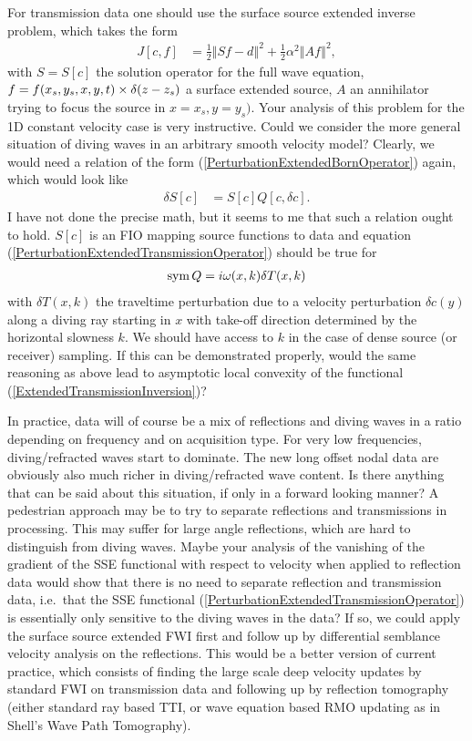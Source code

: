 \documentclass[10pt]{article}
\begin{document}
For transmission data one should use the surface source extended inverse problem, which takes the form
\begin{align}\label{ExtendedTransmissionInversion}
  J[c,f] & = \frac{1}{2}\left\Vert Sf-d \right\Vert^2 + \frac{1}{2}\alpha^2\left\Vert Af\right\Vert^2,
\end{align}
with $S=S[c]$ the solution operator for the full wave equation, $f=f(x_s,y_s,x,y,t)\break\times\delta(z-z_s)$ a surface extended source, $A$ an annihilator trying to focus the source in $x=x_s, y=y_s)$. Your analysis of this problem for the 1D constant velocity case is very instructive. Could we consider the more general situation of diving waves in an arbitrary smooth velocity model? Clearly, we would need a relation of the form (\ref{PerturbationExtendedBornOperator}) again, which would look like
\begin{align}\label{PerturbationExtendedTransmissionOperator}
  \delta S[c] & = S[c]Q[c,\delta c].
\end{align}
I have not done the precise math, but it seems to me that such a relation ought to hold. $S[c]$ is an FIO mapping source functions to data and equation (\ref{PerturbationExtendedTransmissionOperator}) should be true for
\begin{align}\label{symbolQ}
{\rm sym}\, Q=i\omega(x,k)\delta T(x,k)
\end{align} 
with $\delta T(x,k)$ the traveltime perturbation due to a velocity perturbation $\delta c(y)$ along a diving ray starting in $x$ with take-off direction determined by the horizontal slowness $k$. We should have access to $k$ in the case of dense source (or receiver) sampling. If this can be demonstrated properly, would the same reasoning as above lead to asymptotic local convexity of the functional (\ref{ExtendedTransmissionInversion})?

In practice, data will of course be a mix of reflections and diving waves in a ratio depending on frequency and on acquisition type. For very low frequencies, diving/refracted waves start to dominate. The new long offset nodal data are obviously also much richer in diving/refracted wave content. Is there anything that can be said about this situation, if only in a forward looking manner? A pedestrian approach may be to try to separate reflections and transmissions in processing. This may suffer for large angle reflections, which are hard to distinguish from diving waves. Maybe your analysis of the vanishing of the gradient of the SSE functional with respect to velocity when applied to reflection data would show that there is no need to separate reflection and transmission data, i.e.\, that the SSE functional (\ref{PerturbationExtendedTransmissionOperator}) is essentially only sensitive to the diving waves in the data? If so, we could apply the surface source extended FWI first and follow up by differential semblance velocity analysis on the reflections. This would be a better version of current practice, which consists of finding the large scale deep velocity updates by standard FWI on transmission data and following up by reflection tomography (either standard ray based TTI, or wave equation based RMO updating as in Shell's Wave Path Tomography).
\end{document}
